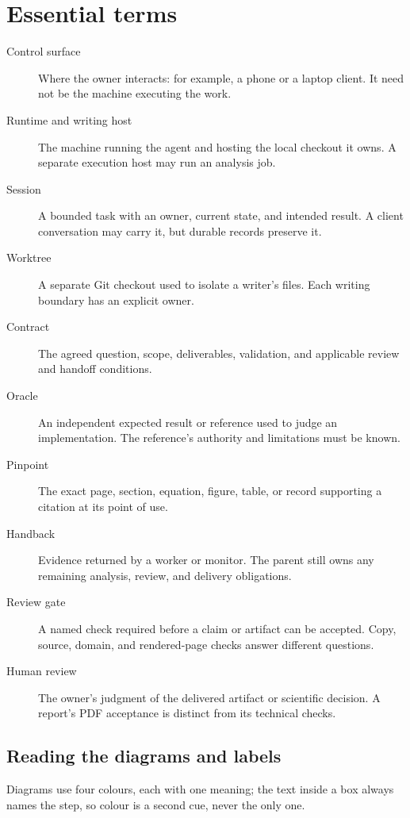 \chapter*{Essential terms}
\begin{description}
  \item[Control surface] Where the owner interacts: for example, a phone or a laptop client. It
        need not be the machine executing the work.
  \item[Runtime and writing host] The machine running the agent and hosting the local checkout it
        owns. A separate execution host may run an analysis job.
  \item[Session] A bounded task with an owner, current state, and intended result. A client
        conversation may carry it, but durable records preserve it.
  \item[Worktree] A separate Git checkout used to isolate a writer's files. Each writing boundary
        has an explicit owner.
  \item[Contract] The agreed question, scope, deliverables, validation, and applicable review and
        handoff conditions.
  \item[Oracle] An independent expected result or reference used to judge an implementation. The
        reference's authority and limitations must be known.
  \item[Pinpoint] The exact page, section, equation, figure, table, or record supporting a
        citation at its point of use.
  \item[Handback] Evidence returned by a worker or monitor. The parent still owns any remaining
        analysis, review, and delivery obligations.
  \item[Review gate] A named check required before a claim or artifact can be accepted. Copy,
        source, domain, and rendered-page checks answer different questions.
  \item[Human review] The owner's judgment of the delivered artifact or scientific decision. A
        report's PDF acceptance is distinct from its technical checks.
\end{description}

\section*{Reading the diagrams and labels}

Diagrams use four colours, each with one meaning; the text inside a box always names the
step, so colour is a second cue, never the only one.

